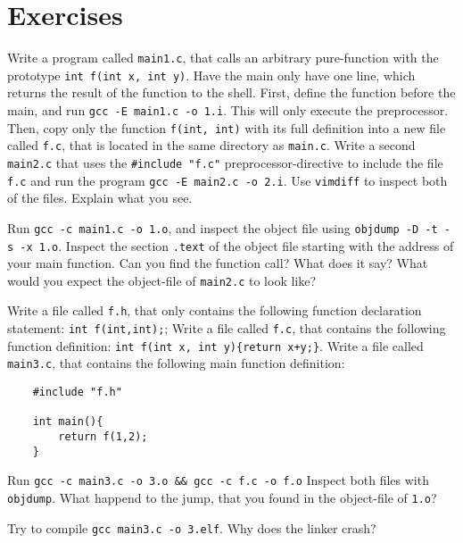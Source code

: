 \documentclass{dcbl/challenge}
\begin{document}
\section*{Exercises}
\begin{aufgabe}
    Write a program called \texttt{main1.c}, that calls an arbitrary pure-function with the prototype \texttt{int f(int x, int y)}.
    Have the main only have one line, which returns the result of the function to the shell.
    First, define the function before the main, and run \texttt{gcc -E main1.c -o 1.i}.
    This will only execute the preprocessor.
    Then, copy only the function \texttt{f(int, int)} with its full definition into a new file called \texttt{f.c}, that is located in the same directory as \texttt{main.c}.
    Write a second \texttt{main2.c} that uses the \texttt{\#include "f.c"} preprocessor-directive to include the file \texttt{f.c} and run the program \texttt{gcc -E main2.c -o 2.i}.
    Use \texttt{vimdiff} to inspect both of the files.
    Explain what you see.
\end{aufgabe}

\begin{aufgabe}
    Run \texttt{gcc -c main1.c -o 1.o}, and inspect the object file using \texttt{objdump -D -t -s -x 1.o}.
    Inspect the section \texttt{.text} of the object file starting with the address of your main function.
    Can you find the function call? 
    What does it say?
    What would you expect the object-file of \texttt{main2.c} to look like?
\end{aufgabe}
    
\begin{aufgabe}
    Write a file called \texttt{f.h}, that only contains the following function declaration statement: \texttt{int f(int,int);};
    Write a file called \texttt{f.c}, that contains the following function definition: \texttt{int f(int x, int y)\{return x+y;\}}.
    Write a file called \texttt{main3.c}, that contains the following main function definition:
    \begin{lstlisting}
    #include "f.h" 
    
    int main(){
        return f(1,2);
    }
    \end{lstlisting}
    Run \texttt{gcc -c main3.c -o 3.o \&\& gcc -c f.c -o f.o}
    Inspect both files with \texttt{objdump}.
    What happend to the jump, that you found in the object-file of \texttt{1.o}?
\end{aufgabe}

\begin{aufgabe}
    Try to compile \texttt{gcc main3.c -o 3.elf}. Why does the linker crash?
\end{aufgabe}
\end{document}
